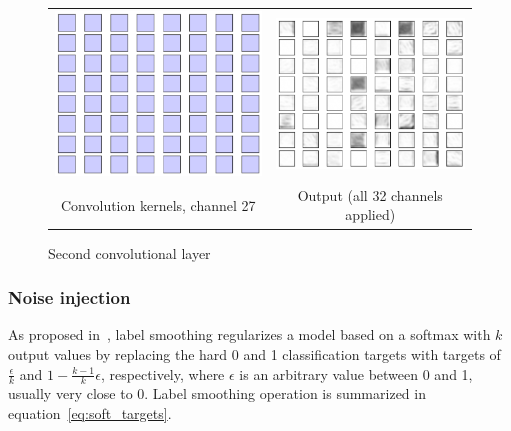 \documentclass[a4paper, 11pt, table]{article}
\begin{document}
\begin{figure}[H]
\begin{tabular}{cc}
	\includegraphics[scale=0.4]{weight_decay/filters2.png} & \includegraphics[scale=0.4]{weight_decay/conv2.png} \\
	Convolution kernels, channel 27 & Output (all 32 channels applied) \\[6pt]

\end{tabular}
\caption{Second convolutional layer}
\end{figure}

\subsubsection{Noise injection}
As proposed in~\cite{dl_book}, label smoothing regularizes a model based on a softmax with $k$ output values by replacing the hard 0 and 1 classification targets with targets of $\frac{\epsilon}{k}$ and $1 - \frac{k-1}{k}\epsilon$, respectively, where $\epsilon$ is an arbitrary value between 0 and 1, usually very close to 0. Label smoothing operation is summarized in equation~\ref{eq:soft_targets}.
\end{document}

